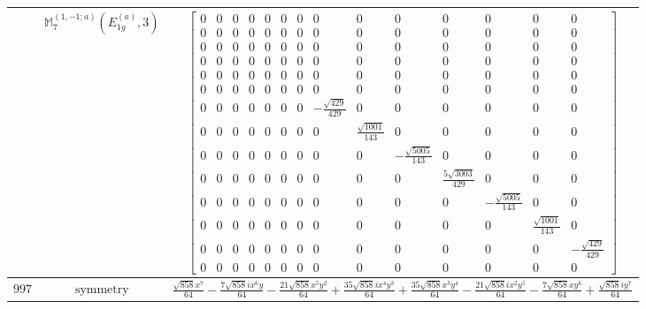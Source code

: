 \documentclass[fleqn,8pt,landscape]{jsarticle}
\begin{document}
\begin{longtable}{ccc}
$  $ & $ \mathbb{M}_{7}^{(1,-1;a)}(E_{1g}^{(a)},3) $ & $ \begin{bmatrix} 0 & 0 & 0 & 0 & 0 & 0 & 0 & 0 & 0 & 0 & 0 & 0 & 0 & 0 \\ 0 & 0 & 0 & 0 & 0 & 0 & 0 & 0 & 0 & 0 & 0 & 0 & 0 & 0 \\ 0 & 0 & 0 & 0 & 0 & 0 & 0 & 0 & 0 & 0 & 0 & 0 & 0 & 0 \\ 0 & 0 & 0 & 0 & 0 & 0 & 0 & 0 & 0 & 0 & 0 & 0 & 0 & 0 \\ 0 & 0 & 0 & 0 & 0 & 0 & 0 & 0 & 0 & 0 & 0 & 0 & 0 & 0 \\ 0 & 0 & 0 & 0 & 0 & 0 & 0 & 0 & 0 & 0 & 0 & 0 & 0 & 0 \\ 0 & 0 & 0 & 0 & 0 & 0 & 0 & - \frac{\sqrt{429}}{429} & 0 & 0 & 0 & 0 & 0 & 0 \\ 0 & 0 & 0 & 0 & 0 & 0 & 0 & 0 & \frac{\sqrt{1001}}{143} & 0 & 0 & 0 & 0 & 0 \\ 0 & 0 & 0 & 0 & 0 & 0 & 0 & 0 & 0 & - \frac{\sqrt{5005}}{143} & 0 & 0 & 0 & 0 \\ 0 & 0 & 0 & 0 & 0 & 0 & 0 & 0 & 0 & 0 & \frac{5 \sqrt{3003}}{429} & 0 & 0 & 0 \\ 0 & 0 & 0 & 0 & 0 & 0 & 0 & 0 & 0 & 0 & 0 & - \frac{\sqrt{5005}}{143} & 0 & 0 \\ 0 & 0 & 0 & 0 & 0 & 0 & 0 & 0 & 0 & 0 & 0 & 0 & \frac{\sqrt{1001}}{143} & 0 \\ 0 & 0 & 0 & 0 & 0 & 0 & 0 & 0 & 0 & 0 & 0 & 0 & 0 & - \frac{\sqrt{429}}{429} \\ 0 & 0 & 0 & 0 & 0 & 0 & 0 & 0 & 0 & 0 & 0 & 0 & 0 & 0 \end{bmatrix} $ \\ \hline
$ 997 $ & $ \text{symmetry} $ & $ \frac{\sqrt{858} x^{7}}{64} - \frac{7 \sqrt{858} i x^{6} y}{64} - \frac{21 \sqrt{858} x^{5} y^{2}}{64} + \frac{35 \sqrt{858} i x^{4} y^{3}}{64} + \frac{35 \sqrt{858} x^{3} y^{4}}{64} - \frac{21 \sqrt{858} i x^{2} y^{5}}{64} - \frac{7 \sqrt{858} x y^{6}}{64} + \frac{\sqrt{858} i y^{7}}{64} $ \\

\end{longtable}
\end{document}
